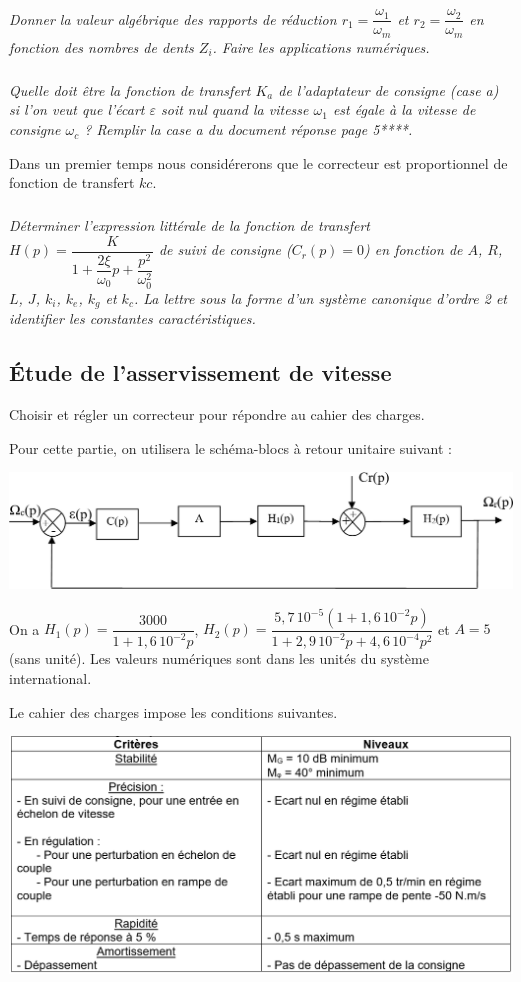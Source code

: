 \documentclass[10pt,fleqn]{article} %
\begin{document}
\begin{multicols}{2}
\subparagraph{}
\textit{Donner la valeur algébrique des rapports de réduction $r_1=\dfrac{\omega_1}{\omega_m}$ et $r_2=\dfrac{\omega_2}{\omega_m}$ en fonction des nombres de dents $Z_i$. Faire les applications numériques.}

\subparagraph{}
\textit{Quelle doit être la fonction de transfert $K_a$ de l'adaptateur de consigne (case a) si l'on veut que l’écart $\varepsilon$ soit nul quand la vitesse $\omega_1$ est égale à la vitesse de consigne $\omega_c$ ? Remplir la case a du document réponse page 5****.}


Dans un premier temps nous considérerons que le correcteur est proportionnel de fonction de transfert $kc$.

\subparagraph{}
\textit{Déterminer l'expression littérale de la fonction de transfert  $H(p)=\dfrac{K}{1+\dfrac{2\xi}{\omega_0}p+\dfrac{p^2}{\omega_0^2}}$ de suivi de consigne ($C_r(p) = 0$) en fonction de $A$, $R$, $L$, $J$, $k_i$, $k_e$, $k_g$ et $k_c$. La  lettre sous la forme d'un système canonique d'ordre 2 et identifier les constantes caractéristiques.}

\subsection*{Étude de l'asservissement de vitesse}

\begin{obj}
Choisir et régler un correcteur pour répondre au cahier des charges.
\end{obj}

Pour cette partie, on utilisera le schéma-blocs à retour unitaire suivant :
\begin{center}
\includegraphics[width=.8\linewidth]{images/e3a_06.png}
\end{center}

On a $H_1(p)=\dfrac{3000}{1+1,6\, 10^{-2}p}$, $H_2(p)=\dfrac{5,7\, 10^{-5}\left(1+ 1,6\, 10^{-2}p\right)}{1+2,9\, 10^{-2}p+4,6\, 10^{-4}p^2}$ et $A=5$ (sans unité). Les valeurs numériques sont dans les unités du système international.

Le cahier des charges impose les conditions suivantes. 
\begin{center}
\includegraphics[width=.8\linewidth]{images/e3a_07.png}
\end{center}


\end{multicols}
\end{document}
